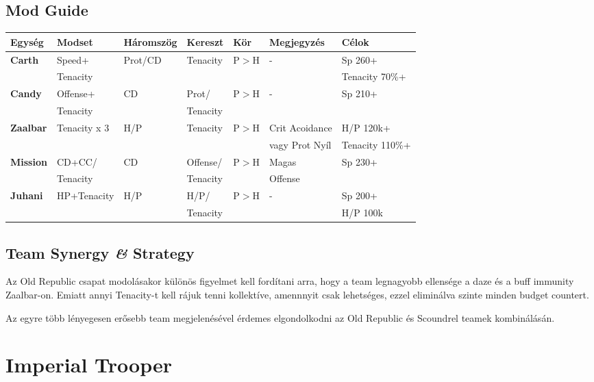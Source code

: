 \documentclass[11pt]{report}
\begin{document}
\section{Mod Guide}
\begin{center}
    \begin{tabular}{|l | l | l | l | l | l | l |}
        \hline
        Egység & Modset & Háromszög & Kereszt & Kör & Megjegyzés & Célok\\ \hline
        \textbf{Carth} & Speed+ & Prot/CD & Tenacity & P$>$H & - & Sp 260+\\
        & Tenacity &  &  &  &  & Tenacity 70\%+\\ \hline
        \textbf{Candy} & Offense+ & CD & Prot/ & P$>$H & - & Sp 210+\\
        & Tenacity &  & Tenacity &  &  & \\ \hline
        \textbf{Zaalbar} & Tenacity x 3 & H/P & Tenacity & P$>$H & Crit Acoidance  & H/P 120k+\\
        &  &  &  &  & vagy Prot Nyíl & Tenacity 110\%+\\ \hline
        \textbf{Mission} & CD+CC/ & CD & Offense/ & P$>$H & Magas & Sp 230+\\
        & Tenacity &  & Tenacity &  & Offense & \\ \hline
        \textbf{Juhani} & HP+Tenacity & H/P & H/P/ & P$>$H & - & Sp 200+\\
        &  &  & Tenacity &  &  & H/P 100k\\ \hline
    \end{tabular}
\end{center}
\section{Team Synergy \textit{\&} Strategy}
Az Old Republic csapat modolásakor különös figyelmet kell fordítani arra, hogy a team legnagyobb ellensége a daze és a buff immunity Zaalbar-on. Emiatt annyi Tenacity-t kell rájuk tenni kollektíve, amennnyit csak lehetséges, ezzel eliminálva szinte minden budget countert.\par
Az egyre több lényegesen erősebb team megjelenésével érdemes elgondolkodni az Old Republic és Scoundrel teamek kombinálásán.


\chapter{Imperial Trooper}
\end{document}
